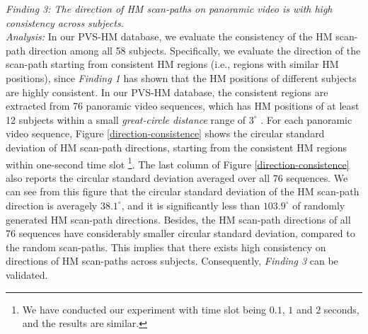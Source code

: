 \documentclass[10pt,journal,compsoc]{IEEEtran}
\begin{document}
\emph{Finding 3: The direction of HM scan-paths on panoramic video is with high consistency across subjects.}
\\ \textit{Analysis:} In  our PVS-HM database, we evaluate the consistency of the HM scan-path direction among all 58 subjects.
Specifically, we evaluate the direction of the scan-path starting from consistent HM regions (i.e., regions with similar HM positions), since \textit{Finding 1} has shown that the HM positions of different subjects are highly consistent. In our PVS-HM database, the consistent regions are extracted from 76 panoramic video sequences, which has HM positions of at least 12 subjects within a small \textit{great-circle distance} range of $3^{\circ}$ \cite{matin1974saccadic}. For each panoramic video sequence, Figure \ref{direction-consistence} shows the circular standard deviation \cite{frederic2010mean} of HM scan-path directions, starting from the consistent HM regions within one-second time slot \footnote{We have conducted our experiment with time slot being $0.1$, $1$ and $2$ seconds, and the results are similar.}. The last column of Figure \ref{direction-consistence} also reports the circular standard deviation averaged over all 76 sequences.
We can see from this figure that the circular standard deviation of the HM scan-path direction is averagely $38.1^{\circ}$, and it is significantly less than $103.9^{\circ}$ of randomly generated HM scan-path directions. Besides, the HM scan-path directions of all 76 sequences have considerably smaller circular standard deviation, compared to the random scan-paths.
This implies that there exists high consistency on directions of HM scan-paths across subjects.
Consequently, \textit{Finding 3} can be validated.
\end{document}
